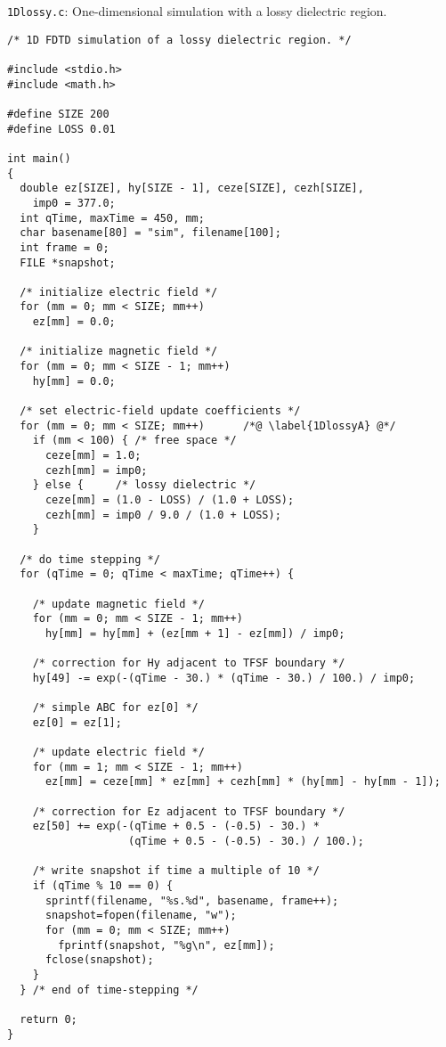 \begin{program}
{\tt 1Dlossy.c}: 
One-dimensional simulation with a lossy dielectric
region. \label{pro:1Dlossy}
\codemiddle
\begin{lstlisting}
/* 1D FDTD simulation of a lossy dielectric region. */

#include <stdio.h>
#include <math.h>

#define SIZE 200
#define LOSS 0.01

int main()
{
  double ez[SIZE], hy[SIZE - 1], ceze[SIZE], cezh[SIZE],
    imp0 = 377.0;
  int qTime, maxTime = 450, mm;
  char basename[80] = "sim", filename[100];
  int frame = 0;
  FILE *snapshot;

  /* initialize electric field */
  for (mm = 0; mm < SIZE; mm++)
    ez[mm] = 0.0;

  /* initialize magnetic field */
  for (mm = 0; mm < SIZE - 1; mm++)
    hy[mm] = 0.0;

  /* set electric-field update coefficients */
  for (mm = 0; mm < SIZE; mm++)      /*@ \label{1DlossyA} @*/
    if (mm < 100) { /* free space */
      ceze[mm] = 1.0;
      cezh[mm] = imp0;
    } else {     /* lossy dielectric */
      ceze[mm] = (1.0 - LOSS) / (1.0 + LOSS);
      cezh[mm] = imp0 / 9.0 / (1.0 + LOSS);
    }

  /* do time stepping */
  for (qTime = 0; qTime < maxTime; qTime++) {

    /* update magnetic field */
    for (mm = 0; mm < SIZE - 1; mm++)
      hy[mm] = hy[mm] + (ez[mm + 1] - ez[mm]) / imp0;

    /* correction for Hy adjacent to TFSF boundary */
    hy[49] -= exp(-(qTime - 30.) * (qTime - 30.) / 100.) / imp0;

    /* simple ABC for ez[0] */
    ez[0] = ez[1];

    /* update electric field */
    for (mm = 1; mm < SIZE - 1; mm++)
      ez[mm] = ceze[mm] * ez[mm] + cezh[mm] * (hy[mm] - hy[mm - 1]);

    /* correction for Ez adjacent to TFSF boundary */
    ez[50] += exp(-(qTime + 0.5 - (-0.5) - 30.) *
                   (qTime + 0.5 - (-0.5) - 30.) / 100.);

    /* write snapshot if time a multiple of 10 */
    if (qTime % 10 == 0) {
      sprintf(filename, "%s.%d", basename, frame++);
      snapshot=fopen(filename, "w");
      for (mm = 0; mm < SIZE; mm++)
        fprintf(snapshot, "%g\n", ez[mm]);
      fclose(snapshot);
    }
  } /* end of time-stepping */

  return 0;
}
\end{lstlisting}
\end{program}

